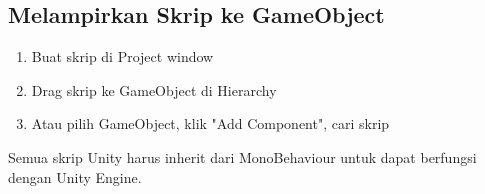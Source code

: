\subsection{Melampirkan Skrip ke GameObject}

\begin{enumerate}
\item Buat skrip di Project window
\item Drag skrip ke GameObject di Hierarchy
\item Atau pilih GameObject, klik "Add Component", cari skrip
\end{enumerate}

\begin{catatan}
Semua skrip Unity harus inherit dari MonoBehaviour untuk dapat berfungsi dengan Unity Engine.
\end{catatan}

